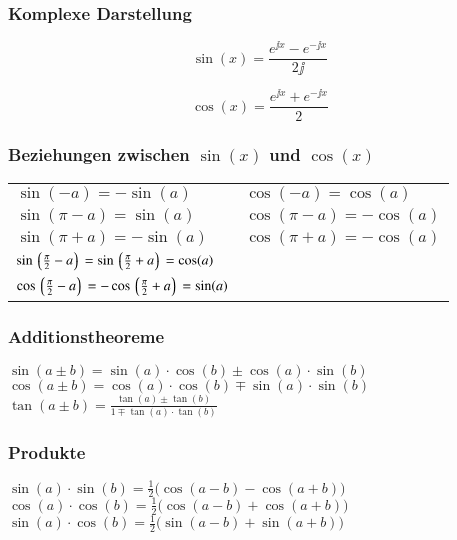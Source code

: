 \subsubsection{Komplexe Darstellung}
		
\begin{minipage}{0.48\linewidth}
$$ \sin(x) = \frac{e^{\jj x} - e^{-\jj x}}{2\jj } $$ 
\end{minipage}	
\hfill
\begin{minipage}{0.48\linewidth}
$$ \cos(x) = \frac{e^{\jj x} + e^{-\jj x}}{2} $$ 
\end{minipage}		



\subsubsection{Beziehungen zwischen $\sin(x)$ und $\cos(x)$}
\begin{tabular}{ll}
$\sin(-a) = -\sin(a)$ & $\cos(-a) = \cos(a)$ \\
$\sin(\pi - a) = \sin(a)$ & $\cos(\pi -a) = - \cos(a)$ \\		
$\sin(\pi + a) = -\sin(a)$ & $\cos(\pi + a) = - \cos(a)$ \\	
$\sin\left\lgroup \frac{\pi}{2} - a \right\rgroup = \sin\left\lgroup \frac{\pi}{2} + a \right\rgroup = \cos(a)$ \\
$\cos\left\lgroup \frac{\pi}{2} - a \right\rgroup = - \cos\left\lgroup \frac{\pi}{2} + a \right\rgroup = \sin(a)$	 
\end{tabular}


\subsubsection{Additionstheoreme}

$\sin(a \pm b) = \sin(a) \cdot \cos(b) \pm \cos(a) \cdot \sin(b)$ \\
$\cos(a \pm b) = \cos(a) \cdot \cos(b) \mp \sin(a) \cdot \sin(b) $ \\
$\tan(a \pm b) = \frac{\tan(a) \pm \tan(b)}{1 \mp \tan(a) \cdot \tan(b)}$

\subsubsection{Produkte}
$\sin(a) \cdot \sin(b) = \frac{1}{2} \big( \cos(a-b) - \cos(a+b) \big) $ \\
$\cos(a) \cdot \cos(b) = \frac{1}{2} \big( \cos(a-b) + \cos(a+b) \big) $ \\	
$\sin(a) \cdot \cos(b) = \frac{1}{2} \big( \sin(a-b) + \sin(a+b) \big) $



